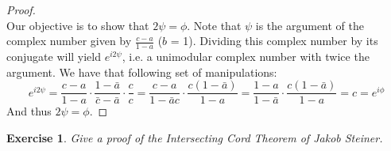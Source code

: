 \documentclass{article}
\newtheorem{exercise}{Exercise}
\begin{document}
\begin{proof}
\\

Our objective is to show that $2\psi = \phi$. Note that $\psi$ is the argument of the complex number given by $\frac{c-a}{1-a}$ ($b$ = 1). Dividing this complex number by its conjugate will yield $e^{i2\psi}$, i.e. a unimodular complex number with twice the argument. We have that following set of manipulations:
\[ e^{i2\psi} = \frac{c-a}{1-a}\cdot \frac{1-\bar{a}}{\bar{c}-\bar{a}} \cdot \frac{c}{c} = \frac{c-a}{1-\bar{a}c} \cdot \frac{c(1-\bar{a})}{1-a} = \frac{1-a}{1-\bar{a}} \cdot \frac{c(1-\bar{a})}{1-a} = c = e^{i\phi} 
  \]
And thus $2 \psi = \phi$.
\end{proof}
\newpage
\begin{exercise}
  Give a proof of the Intersecting Cord Theorem of Jakob Steiner.
\end{exercise}
\end{document}
